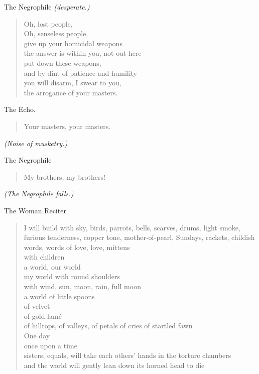\documentclass[letterpaper,article,12pt,oneside,notitlepage]{memoir}
\begin{document}
\begin{center}The Negrophile  \textit{(desperate.)}\end{center}

\begin{verse}
Oh, lost people, \\
Oh, senseless people, \\
give up your homicidal weapons \\
the answer is within you, not out here \\
put down these weapons, \\
and by dint of patience and humility \\
you will disarm, I swear to you, \\
the arrogance of your masters. \\
\end{verse}

\begin{center}The Echo.\end{center}

\begin{verse}
Your masters, your masters. \\
\end{verse}

\textit{(Noise of musketry.)}

\begin{center}The Negrophile \end{center}

\begin{verse}
My brothers, my brothers! \\
\end{verse}

\textit{(The Negrophile falls.)}

\clearpage

\begin{center}The Woman Reciter\end{center}

\begin{verse}
I will build with sky, birds, parrots, bells, scarves, drums, light smoke, furious tenderness, copper tone, mother-of-pearl, Sundays, rackets, childish words, words of love, love, mittens  \\
with children \\
a world, our world \\
my world with round shoulders \\
with wind, sun, moon, rain, full moon \\
a world of little spoons \\
of velvet \\
of gold lamé \\
of hilltops, of valleys, of petals of cries of startled fawn \\
One day \\
once upon a time \\
sisters, equals, will take each others' hands in the torture chambers \\
and the world will gently lean down its horned head to die \\
\end{verse}
\end{document}
